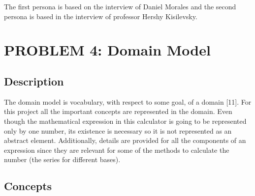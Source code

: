 \documentclass{report}
\begin{document}
The first persona is based on the interview of Daniel Morales and the second persona is based in the interview of professor Hershy Kisilevsky.
\newpage



\newpage



\newpage
\section{PROBLEM 4: Domain Model}

\subsection{Description}

The domain model is vocabulary, with respect to some goal, of a domain [11]. For this project all the important concepts are represented in the domain. Even though the mathematical expression in this calculator is going to be represented only by one number, its existence is necessary so it is not represented as an abstract element. Additionally, details are provided for all the components of an expression since they are relevant for some of the methods to calculate the number (the series for different bases).

\subsection{Concepts}
\end{document}
